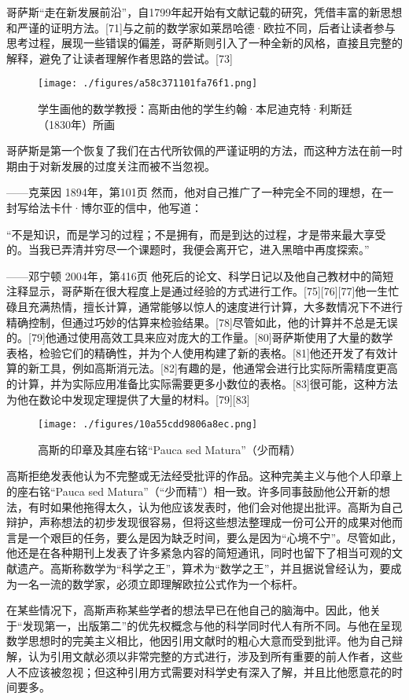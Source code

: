 哥萨斯“走在新发展前沿”，自1799年起开始有文献记载的研究，凭借丰富的新思想和严谨的证明方法。[71]与之前的数学家如莱昂哈德·欧拉不同，后者让读者参与思考过程，展现一些错误的偏差，哥萨斯则引入了一种全新的风格，直接且完整的解释，避免了让读者理解作者思路的尝试。[73]
\begin{figure}[ht]
\centering
\texttt{[image: ./figures/a58c371101fa76f1.png]}
\caption{学生画他的数学教授：高斯由他的学生约翰·本尼迪克特·利斯廷（1830年）所画} \label{fig_KRGS_10}
\end{figure}
哥萨斯是第一个恢复了我们在古代所钦佩的严谨证明的方法，而这种方法在前一时期由于对新发展的过度关注而被不当忽视。

——克莱因 1894年，第101页  
然而，他对自己推广了一种完全不同的理想，在一封写给法卡什·博尔亚的信中，他写道：

“不是知识，而是学习的过程；不是拥有，而是到达的过程，才是带来最大享受的。当我已弄清并穷尽一个课题时，我便会离开它，进入黑暗中再度探索。”

——邓宁顿 2004年，第416页  
他死后的论文、科学日记以及他自己教材中的简短注释显示，哥萨斯在很大程度上是通过经验的方式进行工作。[75][76][77]他一生忙碌且充满热情，擅长计算，通常能够以惊人的速度进行计算，大多数情况下不进行精确控制，但通过巧妙的估算来检验结果。[78]尽管如此，他的计算并不总是无误的。[79]他通过使用高效工具来应对庞大的工作量。[80]哥萨斯使用了大量的数学表格，检验它们的精确性，并为个人使用构建了新的表格。[81]他还开发了有效计算的新工具，例如高斯消元法。[82]有趣的是，他通常会进行比实际所需精度更高的计算，并为实际应用准备比实际需要更多小数位的表格。[83]很可能，这种方法为他在数论中发现定理提供了大量的材料。[79][83]
\begin{figure}[ht]
\centering
\texttt{[image: ./figures/10a55cdd9806a8ec.png]}
\caption{高斯的印章及其座右铭“Pauca sed Matura”（少而精）} \label{fig_KRGS_11}
\end{figure}
高斯拒绝发表他认为不完整或无法经受批评的作品。这种完美主义与他个人印章上的座右铭“Pauca sed Matura”（“少而精”）相一致。许多同事鼓励他公开新的想法，有时如果他拖得太久，认为他应该发表时，他们会对他提出批评。高斯为自己辩护，声称想法的初步发现很容易，但将这些想法整理成一份可公开的成果对他而言是一个艰巨的任务，要么是因为缺乏时间，要么是因为“心境不宁”。尽管如此，他还是在各种期刊上发表了许多紧急内容的简短通讯，同时也留下了相当可观的文献遗产。高斯称数学为“科学之王”，算术为“数学之王”，并且据说曾经认为，要成为一名一流的数学家，必须立即理解欧拉公式作为一个标杆。

在某些情况下，高斯声称某些学者的想法早已在他自己的脑海中。因此，他关于“发现第一，出版第二”的优先权概念与他的科学同时代人有所不同。与他在呈现数学思想时的完美主义相比，他因引用文献时的粗心大意而受到批评。他为自己辩解，认为引用文献必须以非常完整的方式进行，涉及到所有重要的前人作者，这些人不应该被忽视；但这种引用方式需要对科学史有深入了解，并且比他愿意花的时间要多。

